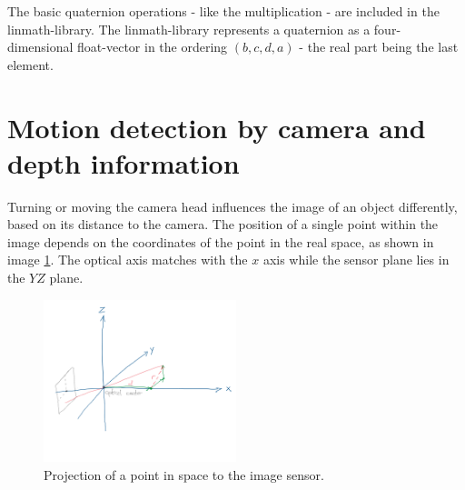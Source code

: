 The basic quaternion operations - like the multiplication - are included in the linmath-library. The linmath-library represents a quaternion as a four-dimensional float-vector in the ordering $(b, c, d, a)$ - the real part being the last element.\\
\section{Motion detection by camera and depth information}
Turning or moving the camera head influences the image of an object differently, based on its distance to the camera. The position of a single point within the image depends on the coordinates of the point in the real space, as shown in image \ref{im:opticalAxis}. The optical axis matches with the $x$ axis while the sensor plane lies in the $YZ$ plane.
\begin{figure}[H]
    \centering
    \includegraphics[width=0.5\textwidth]{images/dummy_optical_axis.png}
    \caption{Projection of a point in space to the image sensor.}
    \label{im:opticalAxis}
\end{figure}
